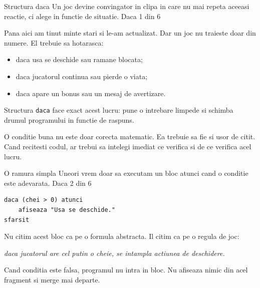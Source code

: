 \PageHeader
  {Structura daca}
  {Un joc devine convingator in clipa in care nu mai repeta aceeasi reactie, ci alege in functie de situatie.}
  {Daca 1 din 6}

\begin{missionbox}
Pana aici am tinut minte stari si le-am actualizat. Dar un joc nu traieste doar din numere. El trebuie sa hotarasca:
\begin{itemize}
\item daca usa se deschide sau ramane blocata;
\item daca jucatorul continua sau pierde o viata;
\item daca apare un bonus sau un mesaj de avertizare.
\end{itemize}

Structura \texttt{daca} face exact acest lucru: pune o intrebare limpede si schimba drumul programului in functie de raspuns.
\end{missionbox}

\begin{conceptbox}[Retinem]
O conditie buna nu este doar corecta matematic. Ea trebuie sa fie si usor de citit. Cand recitesti codul, ar trebui sa intelegi imediat ce verifica si de ce verifica acel lucru.
\end{conceptbox}


\clearpage

\PageHeader
  {O ramura simpla}
  {Uneori vrem doar sa executam un bloc atunci cand o conditie este adevarata.}
  {Daca 2 din 6}

\begin{examplebox}
\begin{lstlisting}[style=codequest]
daca (chei > 0) atunci
    afiseaza "Usa se deschide."
sfarsit
\end{lstlisting}
\end{examplebox}

\begin{missionbox}
Nu citim acest bloc ca pe o formula abstracta. Il citim ca pe o regula de joc:
\begin{center}
\textit{daca jucatorul are cel putin o cheie, se intampla actiunea de deschidere.}
\end{center}
Cand conditia este falsa, programul nu intra in bloc. Nu afiseaza nimic din acel fragment si merge mai departe.
\end{missionbox}

